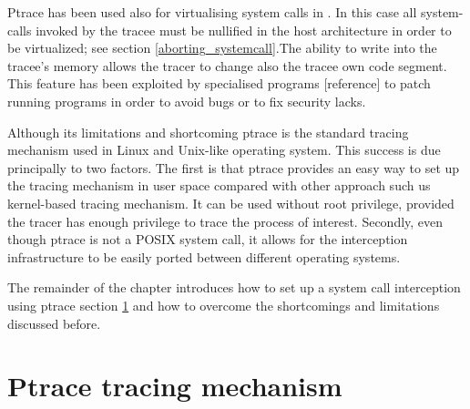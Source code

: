 Ptrace has been used also for virtualising system calls in \cite{UML_1,goanna, UML_2}. In this case all system-calls invoked by the tracee must be nullified in the host architecture in order to be virtualized; see section \ref{aborting_systemcall}.The ability to write into the tracee's memory allows the tracer to change also the tracee own code segment. This feature has been exploited by specialised programs [reference] to patch running programs in order to avoid  bugs or to fix security lacks. 

Although its limitations and shortcoming ptrace is the standard tracing mechanism used in Linux and Unix-like operating system. This success is due principally to two factors. 
The first is that ptrace provides an easy way to set up the tracing mechanism in user space compared with other approach such us kernel-based tracing mechanism. It can be used without root privilege, provided the tracer has enough privilege to trace the process of interest. Secondly, even though ptrace is not a POSIX system call, it allows for the interception infrastructure to be easily ported between different operating systems.  

The remainder of the chapter introduces how to set up a system call interception using ptrace section \ref{Ptrace_tracing_mechanism} and how to overcome the shortcomings and limitations discussed before. 

%
\section{Ptrace tracing mechanism}
\label{Ptrace_tracing_mechanism}

